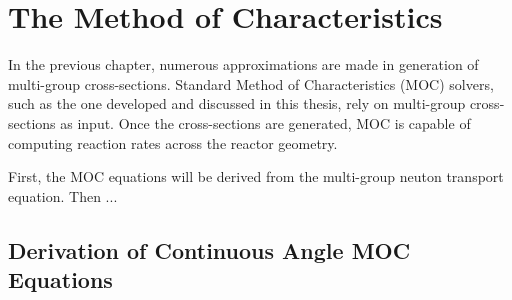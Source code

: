 \chapter{The Method of Characteristics}
\label{chap:moc}

In the previous chapter, numerous approximations are made in generation of multi-group cross-sections. Standard Method of Characteristics (MOC) solvers, such as the one developed and discussed in this thesis, rely on multi-group cross-sections as input. Once the cross-sections are generated, MOC is capable of computing reaction rates across the reactor geometry.

First, the MOC equations will be derived from the multi-group neuton transport equation. Then ...



\section{Derivation of Continuous Angle MOC Equations}
\label{sec:chap3-mc-overview}

